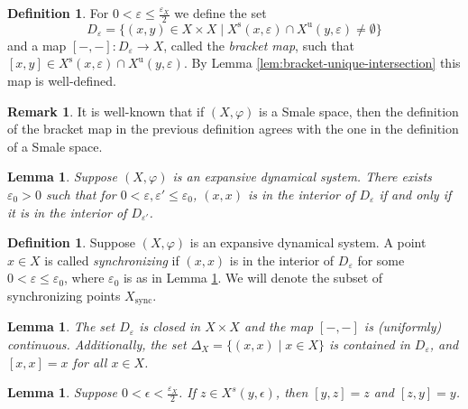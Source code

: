 \documentclass{amsart}
\newcommand{\sync}{\text{sync}}
\theoremstyle{plain}
\newtheorem{lemma}[theorem]{Lemma}
\theoremstyle{definition}
\newtheorem{definition}[theorem]{Definition}
\newtheorem{remark}[theorem]{Remark}
\theoremstyle{remark}
\begin{document}
\begin{definition}\label{def:bracket-map}
For $0 < \varepsilon \leq \frac{\varepsilon_X}{2}$ we define the set
\[ D_\varepsilon = \{ (x, y) \in X \times X \mid X^\text{s}(x, \varepsilon) \cap X^\text{u}(y, \varepsilon) \neq \emptyset \} \]
and a map $[-,-]: D_\varepsilon \to X$, called the \emph{bracket map}, such that $[x,y] \in X^\text{s}(x, \varepsilon) \cap X^\text{u}(y, \varepsilon)$.  By Lemma \ref{lem:bracket-unique-intersection} this map is well-defined.
\end{definition}
\begin{remark}
It is well-known that if $(X, \varphi)$ is a Smale space, then the definition of the bracket map in the previous definition agrees with the one in the definition of a Smale space.
\end{remark}

\begin{lemma}\label{lem:epsilon-naught-existence}
Suppose $(X,\varphi)$ is an expansive dynamical system. There exists $\varepsilon_0 > 0$ such that for $\displaystyle 0 < \varepsilon, \varepsilon' \leq \varepsilon_0$, $(x,x)$ is in the interior of $D_\varepsilon$ if and only if it is in the interior of $D_{\varepsilon'}$.
\end{lemma}

\begin{definition}\label{def:synchronizing-point}
Suppose $(X,\varphi)$ is an expansive dynamical system.  A point $x \in X$ is called \emph{synchronizing} if $(x,x)$ is in the interior of $D_\varepsilon$ for some $\displaystyle 0 < \varepsilon \leq \varepsilon_0$, where $\varepsilon_0$ is as in Lemma \ref{lem:epsilon-naught-existence}.  We will denote the subset of synchronizing points $X_\sync$.
\end{definition}


\begin{lemma} \label{lem:DclosedBraCts}
The set $D_\varepsilon$ is closed in $X \times X$ and the map $[-,-]$ is (uniformly) continuous.  Additionally, the set $\Delta_X = \{(x,x) \mid x \in X\}$ is contained in $D_\varepsilon$, and $[x,x] = x$ for all $x \in X$.
\end{lemma}

\begin{lemma}
Suppose $0< \epsilon < \frac{\varepsilon_X}{2}$. If $z \in X^s(y, \epsilon)$, then $[y,z]=z$ and $[z,y]=y$.
\end{lemma}
\end{document}
